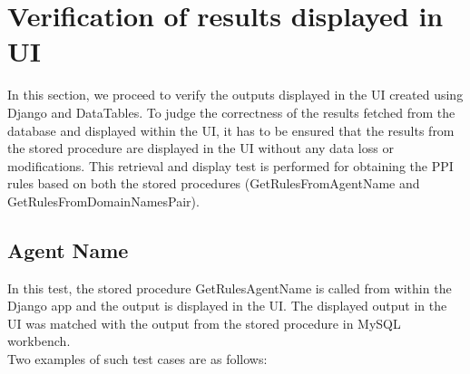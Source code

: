 \documentclass[msc,deptreport,ai]{infthesis}      %
\begin{document}
\section {Verification of results displayed in UI}
In this section, we proceed to verify the outputs displayed in the UI created using Django and DataTables. To judge the correctness of the results fetched from the database and displayed within the UI, it has to be ensured that the results from the stored procedure are displayed in the UI without any data loss or modifications. This retrieval and display test is performed for obtaining the PPI rules based on both the stored procedures (GetRulesFromAgentName and GetRulesFromDomainNamesPair).

\subsection{Agent Name}
In this test, the stored procedure GetRulesAgentName is called from within the Django app and the output is displayed in the UI. The displayed output in the UI was matched with the output from the stored procedure in MySQL workbench.\\ Two examples of such test cases are as follows:
\end{document}
